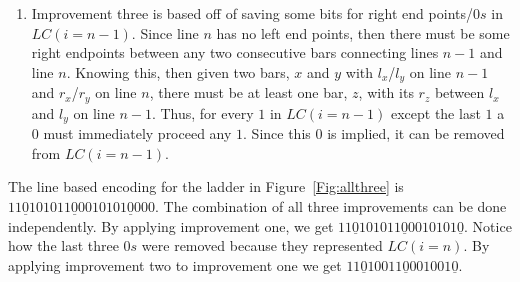 \begin{enumerate}
\item Improvement three is based off of saving some bits for right 
end points/$0s$ in $LC(i=n-1)$. Since line $n$ has no left end points,
then there must be some right endpoints between any two 
consecutive bars connecting lines $n-1$ and line $n$. Knowing this, then 
given two bars, $x$ and $y$ with $l_{x}$/$l_{y}$ on line 
$n-1$ and $r_{x}$/$r_{y}$ on line $n$, there must be at least 
one bar, $z$, with its $r_{z}$ between $l_{x}$ and $l_{y}$
on line $n-1$. Thus, for every $1$ in $LC(i=n-1)$ except the 
last $1$ a $0$ must immediately proceed any $1$. 
Since this $0$ is implied, it can be removed from $LC(i=n-1)$.
\end{enumerate} 
The line based encoding for the ladder in Figure~\ref{Fig:allthree} is $11\underline{0}101011\underline{0}0010101\underline{0}000$. 
The combination of all three improvements can be done independently.\newline 
By applying improvement one, we get $11\underline{0}101011\underline{0}0010101\underline{0}$. 
Notice how the last three $0s$ were removed because they represented $LC(i=n)$.
By applying improvement two to improvement one we get $11\underline{0}10011\underline{0}001001\underline{0}$.
